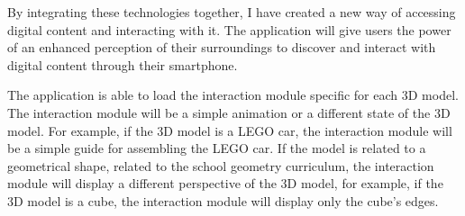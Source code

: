 By integrating these technologies together, I have created a new way of accessing digital content and interacting with it. The application will give users the power of an enhanced perception of their surroundings to discover and interact with digital content through their smartphone.


The application is able to load the interaction module specific for each \ac{3D} model. The interaction module will be a simple animation or a different state of the \ac{3D} model. For example, if the \ac{3D} model is a LEGO car, the interaction module will be a simple guide for assembling the LEGO car. If the model is related to a geometrical shape, related to the school geometry curriculum, the interaction module will display a different perspective of the \ac{3D} model, for example, if the \ac{3D} model is a cube, the interaction module will display only the cube's edges.



